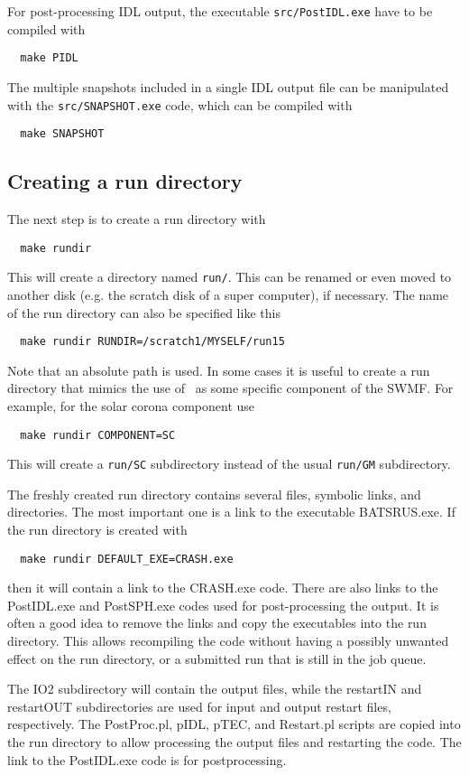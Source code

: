 For post-processing IDL output, the executable {\tt src/PostIDL.exe}
have to be compiled with 
\begin{verbatim}
  make PIDL
\end{verbatim}
The multiple snapshots included in a single IDL output file can be 
manipulated with the {\tt src/SNAPSHOT.exe} code, 
which can be compiled with
\begin{verbatim}
  make SNAPSHOT
\end{verbatim}

\subsection{Creating a run directory}

The next step is to create a run directory with
\begin{verbatim}
  make rundir
\end{verbatim}
This will create a directory named {\tt run/}. This can be renamed
or even moved to another disk (e.g. the scratch disk of a super
computer), if necessary. The name of the run directory can also
be specified like this 
\begin{verbatim}
  make rundir RUNDIR=/scratch1/MYSELF/run15
\end{verbatim}
Note that an absolute path is used. 
In some cases it is useful to create a run directory that mimics
the use of \BATSRUS\ as some specific component of the SWMF. 
For example, for the solar corona component use
\begin{verbatim}
  make rundir COMPONENT=SC
\end{verbatim}
This will create a {\tt run/SC} subdirectory instead of the usual
{\tt run/GM} subdirectory.

The freshly created run directory contains several files, symbolic links, 
and directories. The most important one is a link to the executable BATSRUS.exe. 
If the run directory is created with
\begin{verbatim}
  make rundir DEFAULT_EXE=CRASH.exe
\end{verbatim}
then it will contain a link to the CRASH.exe code. There are also links to
the PostIDL.exe and PostSPH.exe codes used for post-processing the output.
It is often a good idea to remove the links and copy the executables into
the run directory. This allows recompiling the code without having a possibly
unwanted effect on the run directory, or a submitted run that is still in 
the job queue.

The IO2 subdirectory will contain the output files, while the restartIN and restartOUT
subdirectories are used for input and output restart files, respectively.
The PostProc.pl, pIDL, pTEC, and Restart.pl scripts are copied into the 
run directory to allow processing the output files and restarting the code.
The link to the PostIDL.exe code is for postprocessing.

